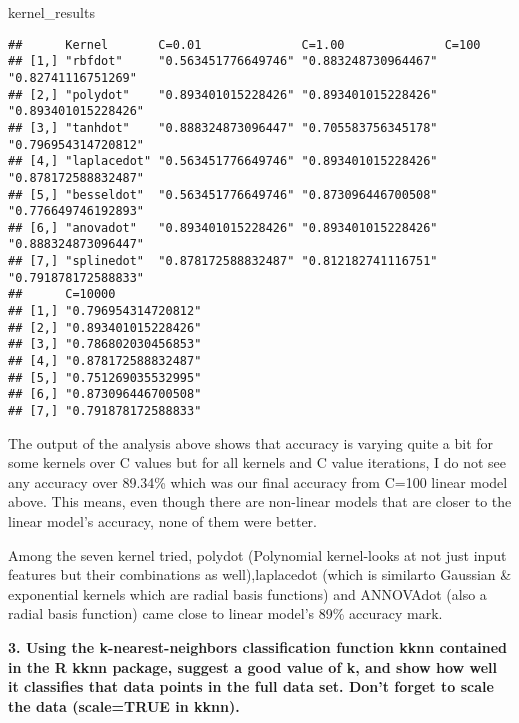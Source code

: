 \documentclass[
]{article}
\newenvironment{Shaded}{\begin{snugshade}}{\end{snugshade}}
\newcommand{\NormalTok}[1]{#1}
\begin{document}
\begin{Shaded}
\begin{Highlighting}[]
\NormalTok{kernel_results}
\end{Highlighting}
\end{Shaded}

\begin{verbatim}
##      Kernel       C=0.01              C=1.00              C=100              
## [1,] "rbfdot"     "0.563451776649746" "0.883248730964467" "0.82741116751269" 
## [2,] "polydot"    "0.893401015228426" "0.893401015228426" "0.893401015228426"
## [3,] "tanhdot"    "0.888324873096447" "0.705583756345178" "0.796954314720812"
## [4,] "laplacedot" "0.563451776649746" "0.893401015228426" "0.878172588832487"
## [5,] "besseldot"  "0.563451776649746" "0.873096446700508" "0.776649746192893"
## [6,] "anovadot"   "0.893401015228426" "0.893401015228426" "0.888324873096447"
## [7,] "splinedot"  "0.878172588832487" "0.812182741116751" "0.791878172588833"
##      C=10000            
## [1,] "0.796954314720812"
## [2,] "0.893401015228426"
## [3,] "0.786802030456853"
## [4,] "0.878172588832487"
## [5,] "0.751269035532995"
## [6,] "0.873096446700508"
## [7,] "0.791878172588833"
\end{verbatim}

The output of the analysis above shows that accuracy is varying quite a
bit for some kernels over C values but for all kernels and C value
iterations, I do not see any accuracy over 89.34\% which was our final
accuracy from C=100 linear model above. This means, even though there
are non-linear models that are closer to the linear model's accuracy,
none of them were better.

Among the seven kernel tried, polydot (Polynomial kernel-looks at not
just input features but their combinations as well),laplacedot (which is
similarto Gaussian \& exponential kernels which are radial basis
functions) and ANNOVAdot (also a radial basis function) came close to
linear model's 89\% accuracy mark.

\textbf{3. Using the k-nearest-neighbors classification function kknn
contained in the R kknn package, suggest a good value of k, and show how
well it classifies that data points in the full data set. Don't forget
to scale the data (scale=TRUE in kknn).}
\end{document}
